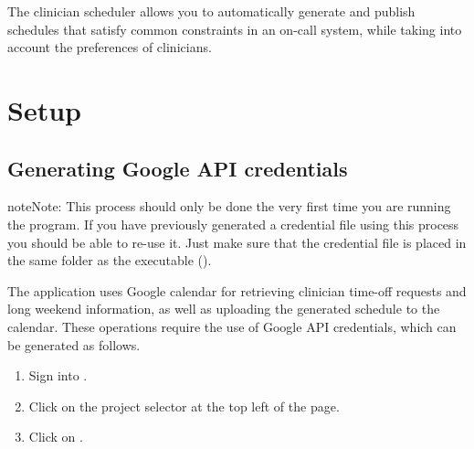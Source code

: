 \documentclass[letterpaper,10pt,english]{sphinxmanual}
\begin{document}
The clinician scheduler allows you to automatically generate and publish
schedules that satisfy common constraints in an on-call system, while taking
into account the preferences of clinicians.


\chapter{Setup}
\label{\detokenize{index:setup}}

\section{Generating Google API credentials}
\label{\detokenize{index:generating-google-api-credentials}}
\begin{sphinxadmonition}{note}{Note:}
This process should only be done the very first time you are running
the program. If you have previously generated a credential file using
this process you should be able to re-use it. Just make sure that the
credential file is placed in the same folder as the executable ().
\end{sphinxadmonition}

The application uses Google calendar for retrieving clinician
time-off requests and long weekend information, as well as uploading the
generated schedule to the calendar. These operations require the use
of Google API credentials, which can be generated as follows.
\begin{enumerate}
\item {} 
Sign into .

\item {} 
Click on the project selector at the top left of the page.

\end{enumerate}

\begin{figure}[h!]
\centering
{}\end{figure}

\begin{DUlineblock}{0em}
\item[] 
\end{DUlineblock}
\begin{enumerate}
\setcounter{enumi}{2}
\item {} 
Click on .

\end{enumerate}
\end{document}
